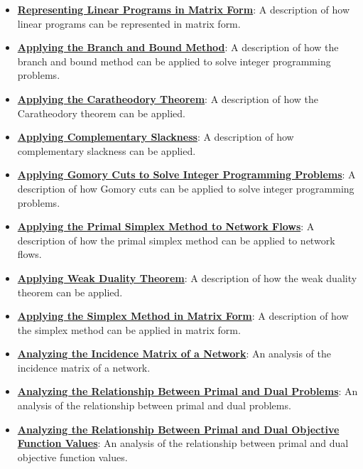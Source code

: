 \documentclass{article}%
\begin{document}
\begin{itemize}[leftmargin=*]
\item \href{https://www.math.purdue.edu/~yipn/421/2024-12-03-Duality.pdf#page=1}{\textbf{Representing Linear Programs in Matrix Form}}: A description of how linear programs can be represented in matrix form. %
\item \href{https://www.math.purdue.edu/~yipn/421/2024-12-03-Duality.pdf#page=1}{\textbf{Applying the Branch and Bound Method}}: A description of how the branch and bound method can be applied to solve integer programming problems. %
\item \href{https://www.math.purdue.edu/~yipn/421/2024-12-03-Duality.pdf#page=1}{\textbf{Applying the Caratheodory Theorem}}: A description of how the Caratheodory theorem can be applied. %
\item \href{https://www.math.purdue.edu/~yipn/421/2024-12-03-Duality.pdf#page=1}{\textbf{Applying Complementary Slackness}}: A description of how complementary slackness can be applied. %
\item \href{https://www.math.purdue.edu/~yipn/421/2024-12-03-Duality.pdf#page=1}{\textbf{Applying Gomory Cuts to Solve Integer Programming Problems}}: A description of how Gomory cuts can be applied to solve integer programming problems. %
\item \href{https://www.math.purdue.edu/~yipn/421/2024-12-03-Duality.pdf#page=1}{\textbf{Applying the Primal Simplex Method to Network Flows}}: A description of how the primal simplex method can be applied to network flows. %
\item \href{https://www.math.purdue.edu/~yipn/421/2024-12-03-Duality.pdf#page=1}{\textbf{Applying Weak Duality Theorem}}: A description of how the weak duality theorem can be applied. %
\item \href{https://www.math.purdue.edu/~yipn/421/2024-12-03-Duality.pdf#page=1}{\textbf{Applying the Simplex Method in Matrix Form}}: A description of how the simplex method can be applied in matrix form. %
\item \href{https://www.math.purdue.edu/~yipn/421/2024-12-03-Duality.pdf#page=1}{\textbf{Analyzing the Incidence Matrix of a Network}}: An analysis of the incidence matrix of a network. %
\item \href{https://www.math.purdue.edu/~yipn/421/2024-12-03-Duality.pdf#page=1}{\textbf{Analyzing the Relationship Between Primal and Dual Problems}}: An analysis of the relationship between primal and dual problems. %
\item \href{https://www.math.purdue.edu/~yipn/421/2024-12-03-Duality.pdf#page=1}{\textbf{Analyzing the Relationship Between Primal and Dual Objective Function Values}}: An analysis of the relationship between primal and dual objective function values. %

\end{itemize}
\end{document}

